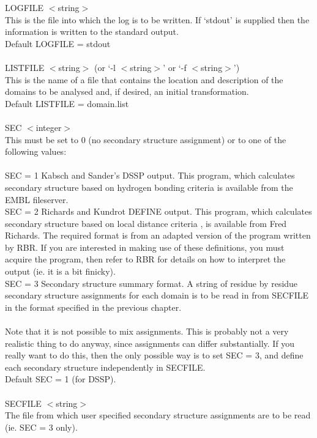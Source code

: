 LOGFILE $<$string$>$\\
This is the file into which the log is to be written.  If
`stdout' is supplied then the information is written to the
standard output.\\
Default LOGFILE = stdout\\
\\
LISTFILE $<$string$>$ (or `-l $<$string$>$' or `-f $<$string$>$')\\
This is the name of a file that contains the location and
description of the domains to be analysed and, if desired, an
initial transformation.\\  
Default LISTFILE = domain.list\\
\\
SEC $<$integer$>$\\
This must be set to 0 (no secondary structure assignment) or
to one of the following values:\\
\\
SEC = 1 Kabsch and Sander's DSSP output.  This program, which
calculates secondary structure based on hydrogen bonding criteria 
\cite{dssp} is available from the EMBL fileserver.
\\
SEC = 2 Richards and Kundrot DEFINE output.  This program, which
calculates secondary structure based on local distance criteria
\cite{define}, is available from Fred Richards.  The required
format  is from an adapted version of the program written by RBR.  If you 
are interested in making use of these definitions, you must acquire
the program, then refer to RBR for details on how to interpret the 
output (ie. it is a bit finicky).
\\
SEC = 3 Secondary structure summary format.  A string of residue by
residue secondary structure assignments for each domain is to be 
read in from SECFILE in the format specified in the previous chapter.\\
\\
Note that it is not possible to mix assignments.  This is probably
not a very realistic thing to do anyway, since assignments can
differ substantially.  If you really want to do this, then the only
possible way is to set SEC = 3, and define each secondary structure
independently in SECFILE.\\
Default SEC = 1 (for DSSP).\\
\\
SECFILE $<$string$>$\\
The file from which user specified secondary structure assignments
are to be read (ie. SEC = 3 only).\\
